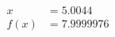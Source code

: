 \documentclass[preview]{standalone}
\begin{document}
\begin{align*}
x &= 5.0044\\f(x) &= 7.9999976
\end{align*}
\end{document}
